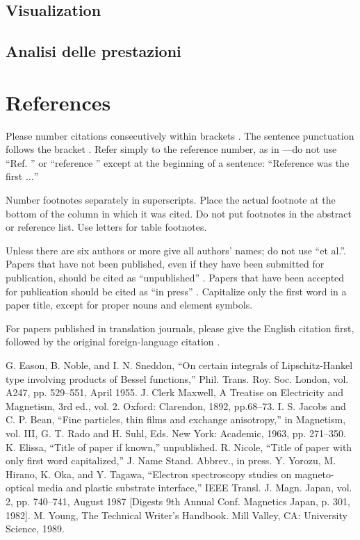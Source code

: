 \documentclass[conference]{IEEEtran}
\begin{document}
\subsection{Visualization}
\subsection{Analisi delle prestazioni}
\section*{References}

Please number citations consecutively within brackets \cite{b1}. The 
sentence punctuation follows the bracket \cite{b2}. Refer simply to the reference 
number, as in \cite{b3}---do not use ``Ref. \cite{b3}'' or ``reference \cite{b3}'' except at 
the beginning of a sentence: ``Reference \cite{b3} was the first $\ldots$''

Number footnotes separately in superscripts. Place the actual footnote at 
the bottom of the column in which it was cited. Do not put footnotes in the 
abstract or reference list. Use letters for table footnotes.

Unless there are six authors or more give all authors' names; do not use 
``et al.''. Papers that have not been published, even if they have been 
submitted for publication, should be cited as ``unpublished'' \cite{b4}. Papers 
that have been accepted for publication should be cited as ``in press'' \cite{b5}. 
Capitalize only the first word in a paper title, except for proper nouns and 
element symbols.

For papers published in translation journals, please give the English 
citation first, followed by the original foreign-language citation \cite{b6}.

\begin{thebibliography}{00}
 G. Eason, B. Noble, and I. N. Sneddon, ``On certain integrals of Lipschitz-Hankel type involving products of Bessel functions,'' Phil. Trans. Roy. Soc. London, vol. A247, pp. 529--551, April 1955.
 J. Clerk Maxwell, A Treatise on Electricity and Magnetism, 3rd ed., vol. 2. Oxford: Clarendon, 1892, pp.68--73.
 I. S. Jacobs and C. P. Bean, ``Fine particles, thin films and exchange anisotropy,'' in Magnetism, vol. III, G. T. Rado and H. Suhl, Eds. New York: Academic, 1963, pp. 271--350.
 K. Elissa, ``Title of paper if known,'' unpublished.
 R. Nicole, ``Title of paper with only first word capitalized,'' J. Name Stand. Abbrev., in press.
 Y. Yorozu, M. Hirano, K. Oka, and Y. Tagawa, ``Electron spectroscopy studies on magneto-optical media and plastic substrate interface,'' IEEE Transl. J. Magn. Japan, vol. 2, pp. 740--741, August 1987 [Digests 9th Annual Conf. Magnetics Japan, p. 301, 1982].
 M. Young, The Technical Writer's Handbook. Mill Valley, CA: University Science, 1989.
\end{thebibliography}
\vspace{12pt}
\end{document}
